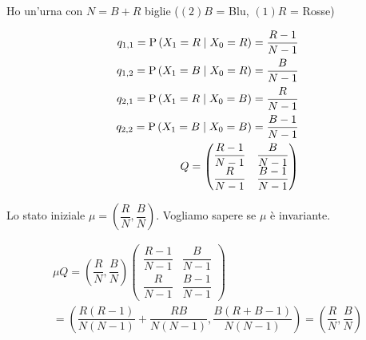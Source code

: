 \begin{exrc}
	Ho un'urna con $ N = B + R$ biglie ($(2) B $ = Blu, $ (1) R $ = Rosse)
	
	\begin{equation*}
	\begin{aligned}
	q_{1,1} = \text{P}\left(X_1 = R \mid X_0 = R\right) = \dfrac{R-1}{N-1} \\
	q_{1,2} = \text{P}\left(X_1 = B \mid X_0 = R\right) = \dfrac{B}{N-1} \\
	q_{2,1} = \text{P}\left(X_1 = R \mid X_0 = B\right) = \dfrac{R}{N-1} \\
	q_{2,2} = \text{P}\left(X_1 = B \mid X_0 = B\right) = \dfrac{B-1}{N-1} \\
	Q = \begin{pmatrix}
	\dfrac{R-1}{N-1} & \dfrac{B}{N-1} \\
	\dfrac{R}{N-1} & \dfrac{B-1}{N-1}
	\end{pmatrix}
	\end{aligned}
	\end{equation*}
	
	Lo stato iniziale $ \mu = \left(\dfrac{R}{N}, \dfrac{B}{N}\right) $. Vogliamo sapere se $ \mu $ è invariante.
	
	\begin{equation*}
	\begin{aligned}
	\mu Q = \left(\dfrac{R}{N}, \dfrac{B}{N}\right)\begin{pmatrix}
	\dfrac{R-1}{N-1} & \dfrac{B}{N-1} \\
	\dfrac{R}{N-1} & \dfrac{B-1}{N-1}
	\end{pmatrix} \\
	= \left(\dfrac{R(R-1)}{N(N-1)} + \dfrac{RB}{N(N-1)}, \dfrac{B(R+B-1)}{N(N-1)}\right) = \left(\dfrac{R}{N}, \dfrac{B}{N}\right)
	\end{aligned}
	\end{equation*}
\end{exrc}

